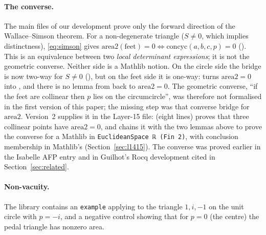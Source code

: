 \documentclass[11pt]{article}
\theoremstyle{definition}
\theoremstyle{remark}
\newcommand{\lean}[1]{\texttt{#1}}
\begin{document}
\paragraph{The converse.} The main files of our development prove only the forward direction
of the Wallace--Simson theorem. For a non-degenerate triangle ($S\ne0$, which implies
distinctness), \eqref{eq:simson} gives
$\mathrm{area2}(\text{feet})=0\iff\mathrm{concyc}(a,b,c,p)=0$
(). This is an equivalence between two \emph{local
determinant expressions}; it is not the geometric converse. Neither side is a Mathlib notion. On
the circle side the bridge is now two-way for $S\ne0$ (),
but on the feet side it is one-way:  turns
$\mathrm{area2}=0$ into , and there is no lemma from  back to
$\mathrm{area2}=0$. The geometric converse, ``if the feet are collinear then $p$ lies on the
circumcircle'', was therefore not formalised in the first version of this paper; the missing step
was that converse bridge for $\mathrm{area2}$. Version~2 supplies it in the Layer-15 file:
 (eight lines) proves that three collinear points
have $\mathrm{area2}=0$, and  chains it with the two lemmas above to
prove the converse for a Mathlib  in \lean{EuclideanSpace ℝ (Fin 2)}, with
conclusion membership in Mathlib's  (Section~\ref{sec:l1415}).
The converse was proved earlier in the Isabelle AFP entry and in
Guilhot's Rocq development cited in Section~\ref{sec:related}.

\paragraph{Non-vacuity.} The library contains an \lean{example} applying  to the
triangle $1,i,-1$ on the unit circle with $p=-i$, and a negative control showing that for $p=0$
(the centre) the pedal triangle has nonzero area.
\end{document}
